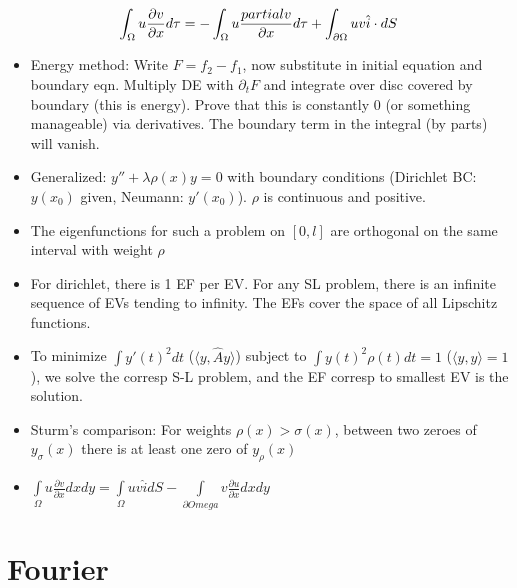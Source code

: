 \documentclass[12pt]{article}
\begin{document}
$$\int_\Omega u\frac{\partial v}{\partial x}d\tau= -\int_\Omega u\frac{\\partial v}{\partial x} d\tau + \int_{\partial\Omega}uv\hat i\cdot dS$$
\begin{itemize}
\item Energy method: Write $F=f_2-f_1$, now substitute in initial equation and boundary eqn. Multiply DE with $\partial_t F$ and integrate over disc covered by boundary (this is energy). Prove that this is constantly 0 (or something manageable) via derivatives. The boundary term in the integral (by parts) will vanish.
\item Generalized: $y''+\lambda\rho(x)y=0$ with boundary conditions (Dirichlet BC: $y(x_0)$ given, Neumann: $y'(x_0)$). $\rho$ is continuous and positive.
\item The eigenfunctions for such a problem on $[0,l]$ are orthogonal on the same interval with weight $\rho$
\item For dirichlet, there is 1 EF per EV. For any SL problem, there is an infinite sequence of EVs tending to infinity. The EFs cover the space of all Lipschitz functions.
\item To minimize $\int y'(t)^2 dt$ ($\langle y,\hat Ay\rangle$) subject to $\int y(t)^2\rho(t) dt=1$ ($\langle y,y\rangle=1$), we solve the corresp S-L problem, and the EF corresp to smallest EV is the solution.
\item Sturm's comparison: For weights $\rho(x)>\sigma(x)$, between two zeroes of $y_\sigma (x)$ there is at least one zero of $y_\rho(x)$
\item $\int\limits_\Omega u\frac{\partial v}{\partial x} dxdy=\int\limits_\Omega uv \hat{i} dS - \int\limits_{\partial Omega} v\frac{\partial u}{\partial x} dx dy$
\end{itemize}
\section{Fourier}
\end{document}
